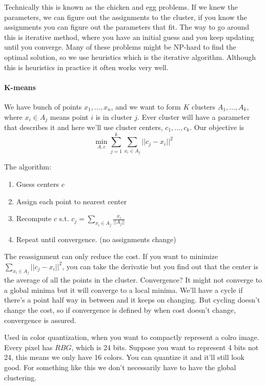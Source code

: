 Technically this is known as the chicken and egg problems. If we knew
the parameters, we can figure out the assignments to the cluster, if
you know the assignments you can figure out the parameters that
fit. The way to go around this is iterative method, where you have an
initial guess and you keep updating until you converge. Many of these problems
might be NP-hard to find the optimal solution, so we use heuristics
which is the iterative algorithm. Although this is heuristics in
practice it often works very well.

\paragraph{K-means}
\label{sec:k-means}
We have bunch of points $x_1, \dots, x_n$, and we want to form $K$
clusters $A_1, \dots , A_k$, where $x_i \in A_j$ means point $i$ is in
cluster $j$. Ever cluster will have a parameter that describes it and
here we'll use cluster centers, $c_1, \dots, c_k$. Our objective is
\begin{equation}
  \label{eq:41}
  \min_{A, c} \sum_{j=1}^k\sum_{x_i\in A_j} ||c_j - x_i||^2
\end{equation}

The algorithm:
\begin{enumerate}
\item   Guess centers $c$
\item Assign each point to nearest center
\item Recompute $c$ s.t. $c_j  = \sum_{x_i\in
  A_j}\frac{x_i}{||A_j||}$
\item Repeat until convergence. (no assignments change)
\end{enumerate}

The reassignment can only reduce the cost. If you want to
minimize $\sum_{x_i\in A_j} ||c_j - x_i||^2$, you can take the
derivatie but you find out that the center is the average of all the
points in the cluster. Convergence? It might not converge to a global
minima but it will converge to a local minima. We'll have a cycle if
there's a point half way in between and it keeps on changing. But
cycling doesn't change the cost, so if convergence is defined by when
cost doesn't change, convergence is assured. 

Used in color quantization, when you want to compactly represent a
colro image. Every pixel has $RBG$, which is 24 bits. Suppose you want
to represent 4 bits not 24, this means we only have 16 colors. You can
quantize it and it'll still look good. For something like this we
don't necessarily have to have the global clustering. 

